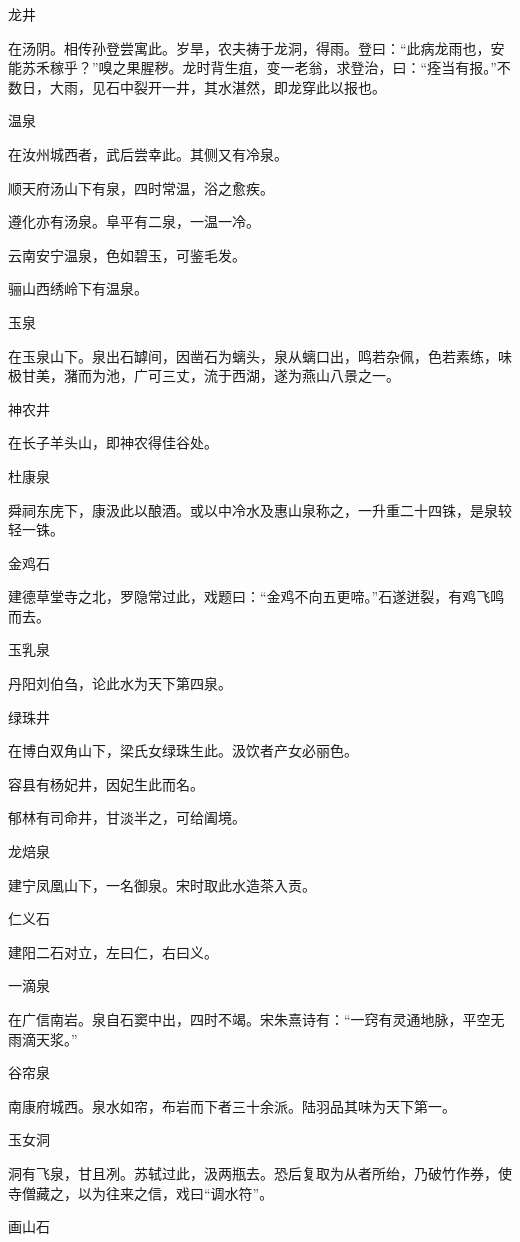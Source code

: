 \documentclass[a4paper,12pt,UTF8,twoside]{ctexbook}
\begin{document}
龙井

在汤阴。相传孙登尝寓此。岁旱，农夫祷于龙洞，得雨。登曰：“此病龙雨也，安能苏禾稼乎？”嗅之果腥秽。龙时背生疽，变一老翁，求登治，曰：“痊当有报。”不数日，大雨，见石中裂开一井，其水湛然，即龙穿此以报也。

温泉

在汝州城西者，武后尝幸此。其侧又有冷泉。

顺天府汤山下有泉，四时常温，浴之愈疾。

遵化亦有汤泉。阜平有二泉，一温一冷。

云南安宁温泉，色如碧玉，可鉴毛发。

骊山西绣岭下有温泉。

玉泉

在玉泉山下。泉出石罅间，因凿石为螭头，泉从螭口出，鸣若杂佩，色若素练，味极甘美，潴而为池，广可三丈，流于西湖，遂为燕山八景之一。

神农井

在长子羊头山，即神农得佳谷处。

杜康泉

舜祠东庑下，康汲此以酿酒。或以中冷水及惠山泉称之，一升重二十四铢，是泉较轻一铢。

金鸡石

建德草堂寺之北，罗隐常过此，戏题曰：“金鸡不向五更啼。”石遂迸裂，有鸡飞鸣而去。

玉乳泉

丹阳刘伯刍，论此水为天下第四泉。

绿珠井

在博白双角山下，梁氏女绿珠生此。汲饮者产女必丽色。

容县有杨妃井，因妃生此而名。

郁林有司命井，甘淡半之，可给阖境。

龙焙泉

建宁凤凰山下，一名御泉。宋时取此水造茶入贡。

仁义石

建阳二石对立，左曰仁，右曰义。

一滴泉

在广信南岩。泉自石窦中出，四时不竭。宋朱熹诗有：“一窍有灵通地脉，平空无雨滴天浆。”

谷帘泉

南康府城西。泉水如帘，布岩而下者三十余派。陆羽品其味为天下第一。

玉女洞

洞有飞泉，甘且冽。苏轼过此，汲两瓶去。恐后复取为从者所绐，乃破竹作券，使寺僧藏之，以为往来之信，戏曰“调水符”。

画山石
\end{document}
